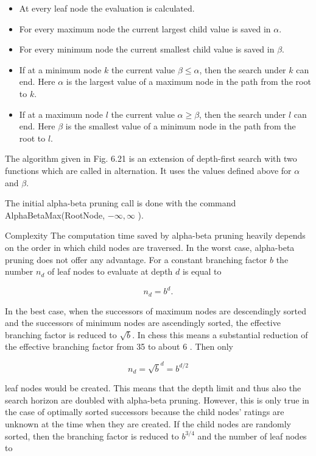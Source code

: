 \documentclass[10pt]{article}
\begin{document}
\begin{itemize}
  \item At every leaf node the evaluation is calculated.
  \item For every maximum node the current largest child value is saved in $\alpha$.
  \item For every minimum node the current smallest child value is saved in $\beta$.
  \item If at a minimum node $k$ the current value $\beta \leq \alpha$, then the search under $k$ can end. Here $\alpha$ is the largest value of a maximum node in the path from the root to $k$.
  \item If at a maximum node $l$ the current value $\alpha \geq \beta$, then the search under $l$ can end. Here $\beta$ is the smallest value of a minimum node in the path from the root to $l$.
\end{itemize}

The algorithm given in Fig. 6.21 is an extension of depth-first search with two functions which are called in alternation. It uses the values defined above for $\alpha$ and $\beta$.

The initial alpha-beta pruning call is done with the command\\
AlphaBetaMax(RootNode, $-\infty, \infty$ ).

Complexity The computation time saved by alpha-beta pruning heavily depends on the order in which child nodes are traversed. In the worst case, alpha-beta\\
pruning does not offer any advantage. For a constant branching factor $b$ the number $n_{d}$ of leaf nodes to evaluate at depth $d$ is equal to

$$
n_{d}=b^{d} .
$$

In the best case, when the successors of maximum nodes are descendingly sorted and the successors of minimum nodes are ascendingly sorted, the effective branching factor is reduced to $\sqrt{b}$. In chess this means a substantial reduction of the effective branching factor from 35 to about 6 . Then only

$$
n_{d}=\sqrt{b}^{d}=b^{d / 2}
$$

leaf nodes would be created. This means that the depth limit and thus also the search horizon are doubled with alpha-beta pruning. However, this is only true in the case of optimally sorted successors because the child nodes' ratings are unknown at the time when they are created. If the child nodes are randomly sorted, then the branching factor is reduced to $b^{3 / 4}$ and the number of leaf nodes to
\end{document}
